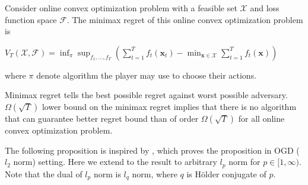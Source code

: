 \documentclass[12pt, a4paper]{report}
\begin{document}
\begin{defn} \label{def:minimax}
Consider online convex optimization problem with a feasible set $\mathcal{X}$ and loss function space $\mathcal{F}$.
The minimax regret of this online convex optimization problem is
\begin{center}
    $\displaystyle V_T(\mathcal{X}, \mathcal{F}) = \inf_{\pi} \sup_{f_1, \dots, f_T} \left( \sum_{t=1}^{T} f_t(\mathbf{x}_t) - \min_{\mathbf{x} \in \mathcal{X}} \sum_{t=1}^{T} f_t(\mathbf{x}) \right)$
\end{center}
where $\pi$ denote algorithm the player may use to choose their actions.
\end{defn}
Minimax regret tells the best possible regret against worst possible adversary. $\Omega(\sqrt{T})$ lower bound on the minimax regret implies that there is no algorithm that can guarantee better regret bound than of order $\Omega(\sqrt{T})$ for all online convex optimization problem.

The following proposition is inspired by \cite[Theorem~5.1]{Orabona2019OnlineLearning}, which proves the proposition in OGD ($l_2$ norm) setting. Here we extend to the result to arbitrary $l_p$ norm for $p \in [1, \infty)$. Note that the dual of $l_p$ norm is $l_q$ norm, where $q$ is H\"older conjugate of $p$.
\end{document}
